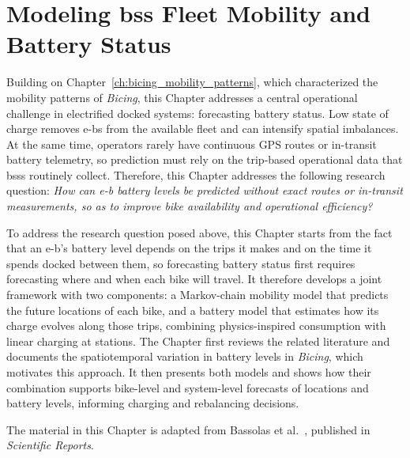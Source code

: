 \chapter[Modeling BSS Fleet Mobility and Battery Status]{Modeling \ac{bss} Fleet Mobility and Battery Status}
\label{ch:mobility_and_battery_modeling_bicing}

Building on Chapter~\ref{ch:bicing_mobility_patterns}, which characterized the mobility patterns of \textit{Bicing}, this Chapter addresses a central operational challenge in electrified docked systems: forecasting battery status. Low state of charge removes \acp{e-b} from the available fleet and can intensify spatial imbalances. At the same time, operators rarely have continuous GPS routes or in-transit battery telemetry, so prediction must rely on the trip-based operational data that \acp{bss} routinely collect. Therefore, this Chapter addresses the following research question: \emph{How can \ac{e-b} battery levels be predicted without exact routes or in-transit measurements, so as to improve bike availability and operational efficiency?}

To address the research question posed above, this Chapter starts from the fact that an \ac{e-b}'s battery level depends on the trips it makes and on the time it spends docked between them, so forecasting battery status first requires forecasting where and when each bike will travel. It therefore develops a joint framework with two components: a Markov-chain mobility model that predicts the future locations of each bike, and a battery model that estimates how its charge evolves along those trips, combining physics-inspired consumption with linear charging at stations. The Chapter first reviews the related literature and documents the spatiotemporal variation in battery levels in \textit{Bicing}, which motivates this approach. It then presents both models and shows how their combination supports bike-level and system-level forecasts of locations and battery levels, informing charging and rebalancing decisions.

The material in this Chapter is adapted from Bassolas et al.~\cite{Bassolas2025}, published in \textit{Scientific Reports}.





